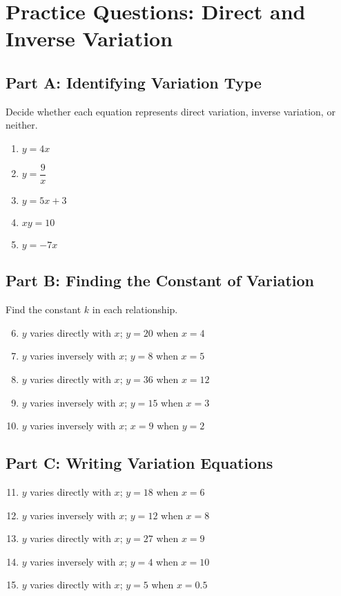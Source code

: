 \documentclass[12pt]{article}
\begin{document}
\newpage


\section*{Practice Questions: Direct and Inverse Variation}

\subsection*{Part A: Identifying Variation Type}
Decide whether each equation represents direct variation, inverse variation, or neither.
\begin{enumerate}
  \item \(y = 4x\)
  \item \(y = \dfrac{9}{x}\)
  \item \(y = 5x + 3\)
  \item \(xy = 10\)
  \item \(y = -7x\)
\end{enumerate}

\subsection*{Part B: Finding the Constant of Variation}
Find the constant \(k\) in each relationship.
\begin{enumerate}
  \setcounter{enumi}{5}
  \item \(y\) varies directly with \(x\); \(y = 20\) when \(x = 4\)
  \item \(y\) varies inversely with \(x\); \(y = 8\) when \(x = 5\)
  \item \(y\) varies directly with \(x\); \(y = 36\) when \(x = 12\)
  \item \(y\) varies inversely with \(x\); \(y = 15\) when \(x = 3\)
  \item \(y\) varies inversely with \(x\); \(x = 9\) when \(y = 2\)
\end{enumerate}

\subsection*{Part C: Writing Variation Equations}
\begin{enumerate}
  \setcounter{enumi}{10}
  \item \(y\) varies directly with \(x\); \(y = 18\) when \(x = 6\)
  \item \(y\) varies inversely with \(x\); \(y = 12\) when \(x = 8\)
  \item \(y\) varies directly with \(x\); \(y = 27\) when \(x = 9\)
  \item \(y\) varies inversely with \(x\); \(y = 4\) when \(x = 10\)
  \item \(y\) varies directly with \(x\); \(y = 5\) when \(x = 0.5\)
\end{enumerate}
\end{document}
